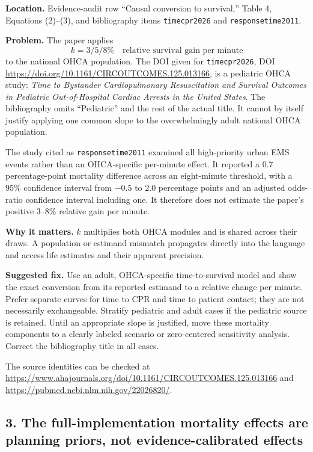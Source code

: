 \documentclass[11pt]{article}
\begin{document}
\textbf{Location.} Evidence-audit row ``Causal conversion to survival,''
Table 4, Equations (2)--(3), and bibliography items
\texttt{timecpr2026} and \texttt{responsetime2011}.

\textbf{Problem.} The paper applies
\[
k=3/5/8\%\quad\text{relative survival gain per minute}
\]
to the national OHCA population.  The DOI given for
\texttt{timecpr2026}, DOI
\url{https://doi.org/10.1161/CIRCOUTCOMES.125.013166}, is a pediatric
OHCA study: \emph{Time to Bystander Cardiopulmonary Resuscitation and Survival
Outcomes in Pediatric Out-of-Hospital Cardiac Arrests in the United States}.
The bibliography omits ``Pediatric'' and the rest of the actual title.  It
cannot by itself justify applying one common slope to the overwhelmingly adult
national OHCA population.

The study cited as \texttt{responsetime2011} examined all high-priority urban
EMS events rather than an OHCA-specific per-minute effect.  It reported a
$0.7$ percentage-point mortality difference across an eight-minute threshold,
with a $95\%$ confidence interval from $-0.5$ to $2.0$ percentage points and an
adjusted odds-ratio confidence interval including one.  It therefore does not
estimate the paper's positive $3$--$8\%$ relative gain per minute.

\textbf{Why it matters.} $k$ multiplies both OHCA modules and is shared across
their draws.  A population or estimand mismatch propagates directly into the
language and access life estimates and their apparent precision.

\textbf{Suggested fix.} Use an adult, OHCA-specific time-to-survival model and
show the exact conversion from its reported estimand to a relative change per
minute.  Prefer separate curves for time to CPR and time to patient contact;
they are not necessarily exchangeable.  Stratify pediatric and adult cases if
the pediatric source is retained.  Until an appropriate slope is justified,
move these mortality components to a clearly labeled scenario or zero-centered
sensitivity analysis.  Correct the bibliography title in all cases.

The source identities can be checked at
\url{https://www.ahajournals.org/doi/10.1161/CIRCOUTCOMES.125.013166}
and \url{https://pubmed.ncbi.nlm.nih.gov/22026820/}.

\subsection*{3. The full-implementation mortality effects are planning priors, not evidence-calibrated effects}
\end{document}
